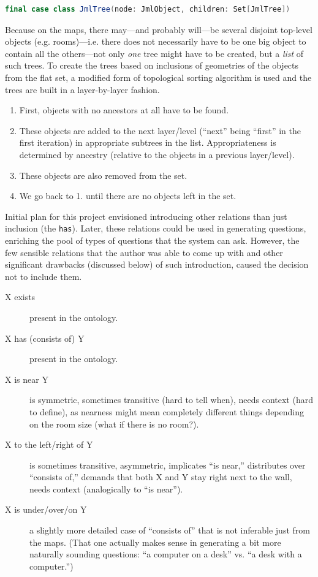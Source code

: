 \begin{lstlisting}[language=scala,caption={Definition of a (sub-)tree establishing the geometrical hierarchy and relations of OpenGIS objects.},label=lst:JmlTree]
final case class JmlTree(node: JmlObject, children: Set[JmlTree])
\end{lstlisting}

Because on the maps, there may---and probably will---be several disjoint top-level objects (e.g. rooms)---i.e. there does not necessarily have to be one big object to contain all the others---not only \emph{one} tree might have to be created, but a \emph{list} of such trees. To create the trees based on inclusions of geometries of the objects from the flat set, a modified form of topological sorting algorithm is used and the trees are built in a layer-by-layer fashion.

\begin{enumerate}
	\item First, objects with no ancestors at all have to be found.
	\item These objects are added to the next layer/level (``next'' being ``first'' in the first iteration) in appropriate subtrees in the list. Appropriateness is determined by ancestry (relative to the objects in a previous layer/level).
	\item These objects are also removed from the set.
	\item We go back to 1. until there are no objects left in the set.
\end{enumerate}

Initial plan for this project envisioned introducing other relations than just inclusion (the \texttt{has}). Later, these relations could be used in generating questions, enriching the pool of types of questions that the system can ask. However, the few sensible relations that the author was able to come up with and other significant drawbacks (discussed below) of such introduction, caused the decision not to include them.

\begin{description}
	\item[X exists] present in the ontology.
	\item[X has (consists of) Y] present in the ontology.
	\item[X is near Y] is symmetric, sometimes transitive (hard to tell when), needs context (hard to define), as nearness might mean completely different things depending on the room size (what if there is no room?).
	\item[X to the left/right of Y] is sometimes transitive, asymmetric, implicates ``is near,'' distributes over ``consists of,'' demands that both X and Y stay right next to the wall, needs context (analogically to ``is near'').
	\item[X is under/over/on Y] a slightly more detailed case of ``consists of'' that is not inferable just from the maps. (That one actually makes sense in generating a bit more naturally sounding questions: ``a computer on a desk'' vs. ``a desk with a computer.'')
\end{description}

